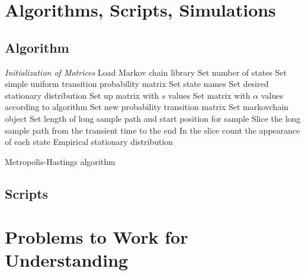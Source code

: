 \documentclass[12pt]{article}
\begin{document}
\section*{Algorithms, Scripts, Simulations}

\subsection*{Algorithm}

\begin{algorithm}[H]
  \DontPrintSemicolon
  \BlankLine
  \emph{Initialization of Matrices}\;
     Load Markov chain library\;
     Set number of states\;
     Set simple uniform transition probability matrix\;
     Set state names\;
     Set desired stationary distribution\;
     Set up matrix with \( s \) values\;
     Set matrix with \( \alpha \) values according to algorithm\;
     Set new probability transition matrix\;
     Set markovchain object\;
     Set length of long sample path and start position for sample\;
     Slice the long sample path from the transient time to the end\;
     In the slice count the appearance of each state\;
     Empirical stationary distribution\;
  \caption{Metropolis-Hastings algorithm}
  \end{algorithm}
  
\subsection*{Scripts}



\hr

\section*{Problems to Work for Understanding}
\renewcommand{\theexerciseseries}{}
\renewcommand{\theexercise}{\arabic{exercise}}
\end{document}
